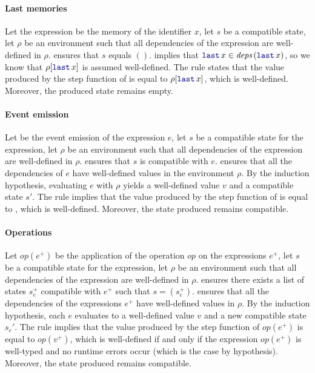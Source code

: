 \begin{skippableproof}
    \paragraph{Last memories}
    Let the expression  be the memory of the identifier $x$, let $s$ be a compatible state,
    let $\rho$ be an environment such that all dependencies of the expression are well-defined in
    $\rho$.
     ensures that $s$ equals $()$.
     implies that $\last{x} \in
        \deps{\last{x}}$, so we know that $\rho[\last{x}]$ is assumed well-defined.
    The rule  states that the value produced by the
    step function of  is equal to $\rho[\last{x}]$, which is well-defined. Moreover, the produced
    state remains empty.

    \paragraph{Event emission}
    Let  be the event emission of the expression $e$, let $s$ be a compatible state for
    the expression, let $\rho$ be an environment such that all dependencies of the expression are
    well-defined in $\rho$.
     ensures that $s$ is compatible with $e$.
     ensures that all the
    dependencies of $e$ have well-defined values in the environment $\rho$.
    By the induction hypothesis, evaluating $e$ with $\rho$ yields a well-defined value $v$ and a
    compatible state $s'$. The rule  implies
    that the value produced by the step function of  is equal to , which is
    well-defined. Moreover, the state produced remains compatible.

    \paragraph{Operations}
    Let $op(e^+)$ be the application of the operation $op$ on the expressions $e^+$, let $s$ be a
    compatible state for the expression, let $\rho$ be an environment such that all dependencies of
    the expression are well-defined in $\rho$.
     ensures there exists a list of states $s_e^+$
    compatible with $e^+$ such that $s = (s_e^+)$.
     ensures that all the dependencies
    of the expressions $e^+$ have well-defined values in $\rho$.
    By the induction hypothesis, each $e$ evaluates to a well-defined value $v$ and a new compatible
    state $s_e'$. The rule  implies that the
    value produced by the step function of $op(e^+)$ is equal to $op(v^+)$, which is well-defined if
    and only if the expression $op(e^+)$ is well-typed and no runtime errors occur (which is the
    case by hypothesis). Moreover, the state produced remains compatible.


\end{skippableproof}
